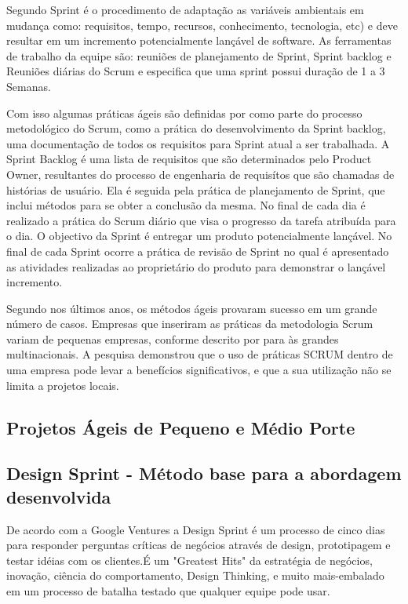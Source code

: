 Segundo \cite{awad2005comparison} Sprint é o procedimento de adaptação as
variáveis ambientais em mudança como: requisitos, tempo, recursos, conhecimento, tecnologia, etc) e deve resultar em um incremento potencialmente lançável de software.
As ferramentas de trabalho da equipe são: reuniões de planejamento de Sprint, Sprint backlog e Reuniões diárias do Scrum e \cite{srivastava2017scrum} especifica que uma sprint possui duração de 1 a 3
Semanas. 

Com isso algumas práticas ágeis são definidas por \cite{srivastava2017scrum} como parte do processo metodológico do Scrum, como a prática do desenvolvimento da Sprint backlog, uma documentação de todos os requisitos para Sprint atual a ser trabalhada. A Sprint Backlog é uma lista de requisitos que são determinados pelo Product Owner, resultantes do processo de engenharia de requisítos que são chamadas de histórias de usuário. Ela é seguida pela prática de planejamento de Sprint, que inclui métodos para se obter a conclusão da mesma. No final de cada dia é realizado a prática do Scrum diário
que visa o progresso da tarefa atribuída para o dia. O objectivo
da Sprint é entregar um produto potencialmente lançável.
No final de cada Sprint ocorre a prática de revisão de Sprint no qual é apresentado as atividades realizadas ao proprietário do produto para demonstrar o lançável incremento.


Segundo \cite{vlaanderen2011agile} nos últimos anos, os métodos ágeis provaram sucesso em um grande número de casos. 
Empresas que inseriram as práticas da metodologia Scrum
variam de pequenas empresas, conforme descrito por \cite{vlaanderen2011agile} para às  grandes multinacionais. 
A pesquisa demonstrou que o uso de práticas SCRUM dentro de uma empresa pode levar a benefícios significativos, e que a sua utilização não se limita a projetos locais.

\subsection{Projetos Ágeis de Pequeno e Médio Porte}

\subsection{Design Sprint - Método base para a abordagem desenvolvida}

De acordo com a Google Ventures a Design Sprint é um processo de cinco dias para responder perguntas críticas de negócios através de design, prototipagem e testar idéias com os clientes.É um "Greatest Hits" da estratégia de negócios, inovação, ciência do comportamento, Design Thinking, e muito mais-embalado em um processo de batalha testado que qualquer equipe pode usar.

